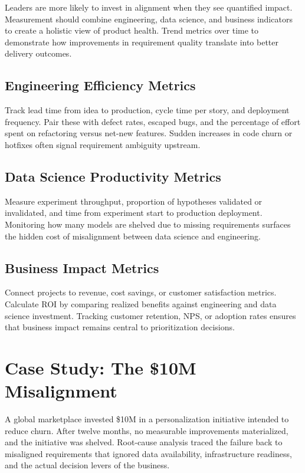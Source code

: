 Leaders are more likely to invest in alignment when they see quantified impact. Measurement should combine engineering, data science, and business indicators to create a holistic view of product health. Trend metrics over time to demonstrate how improvements in requirement quality translate into better delivery outcomes.

\subsection{Engineering Efficiency Metrics}
Track lead time from idea to production, cycle time per story, and deployment frequency. Pair these with defect rates, escaped bugs, and the percentage of effort spent on refactoring versus net-new features. Sudden increases in code churn or hotfixes often signal requirement ambiguity upstream.

\subsection{Data Science Productivity Metrics}
Measure experiment throughput, proportion of hypotheses validated or invalidated, and time from experiment start to production deployment. Monitoring how many models are shelved due to missing requirements surfaces the hidden cost of misalignment between data science and engineering.

\subsection{Business Impact Metrics}
Connect projects to revenue, cost savings, or customer satisfaction metrics. Calculate ROI by comparing realized benefits against engineering and data science investment. Tracking customer retention, NPS, or adoption rates ensures that business impact remains central to prioritization decisions.

\section{Case Study: The \$10M Misalignment}
\label{sec:case-10m}

A global marketplace invested \$10M in a personalization initiative intended to reduce churn. After twelve months, no measurable improvements materialized, and the initiative was shelved. Root-cause analysis traced the failure back to misaligned requirements that ignored data availability, infrastructure readiness, and the actual decision levers of the business.

